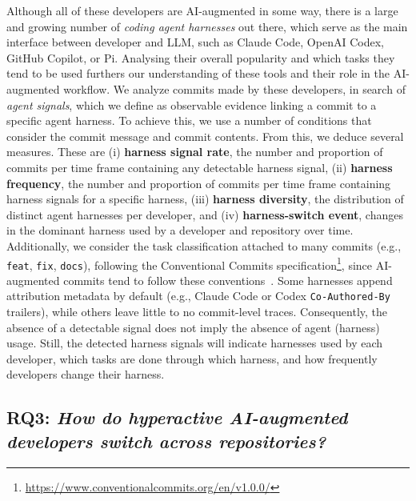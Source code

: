 \documentclass[smallextended]{svjour3}
\begin{document}
Although all of these developers are AI-augmented in some way, there is a large and growing number of \emph{coding agent harnesses} out there, which serve as the main interface between developer and LLM, such as Claude Code, OpenAI Codex, GitHub Copilot, or Pi. Analysing their overall popularity and which tasks they tend to be used furthers our understanding of these tools and their role in the AI-augmented workflow.  
We analyze commits made by these developers, in search of \emph{agent signals}, which we define as observable evidence linking a commit to a specific agent harness. To achieve this, we use a number of conditions that consider the commit message and commit contents. From this, we deduce several measures. These are
(i) \textbf{harness signal rate}, the number and proportion of commits per time frame containing any detectable harness signal,
(ii) \textbf{harness frequency}, the number and proportion of commits per time frame containing harness signals for a specific harness,
(iii) \textbf{harness diversity}, the distribution of distinct agent harnesses per developer,
and (iv) \textbf{harness-switch event}, changes in the dominant harness used by a developer and repository over time.
Additionally, we consider the task classification attached to many commits (e.g., \texttt{feat}, \texttt{fix}, \texttt{docs}), following the Conventional Commits specification\footnote{\url{https://www.conventionalcommits.org/en/v1.0.0/}}, since AI-augmented commits tend to follow these conventions~\cite{Robbes2026}.
Some harnesses append attribution metadata by default (e.g., Claude Code or Codex \texttt{Co-Authored-By} trailers), while others leave little to no commit-level traces. Consequently, the absence of a detectable signal does not imply the absence of agent (harness) usage. Still, the detected harness signals will indicate harnesses used by each developer, which tasks are done through which harness, and how frequently developers change their harness.


\subsection*{RQ3: \emph{How do hyperactive AI-augmented developers switch across repositories?}}
\end{document}
